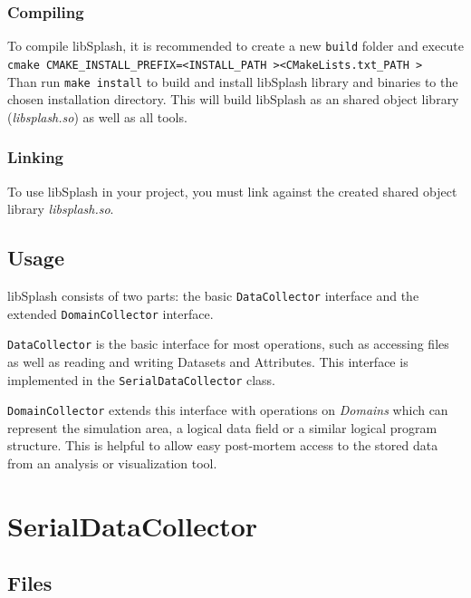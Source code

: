 \documentclass[a4paper,10pt,BCOR12mm]{report}
\newcommand{\command}[1]{\small \texttt{#1}}
\begin{document}
\subsection{Compiling}

To compile libSplash, it is recommended to create a new \command{build} folder
and execute \command{cmake CMAKE\_INSTALL\_PREFIX=\textless INSTALL\_PATH \textgreater \textless CMakeLists.txt\_PATH \textgreater}\\
Than run \command{make install} to build and install libSplash library and binaries to the chosen installation directory.
This will build libSplash as an shared object library (\emph{libsplash.so}) as well as all tools.

\subsection{Linking}

To use libSplash in your project, you must link against the created shared object library
\emph{libsplash.so}.


\section{Usage}

libSplash consists of two parts: the basic \texttt{DataCollector} interface and the extended \texttt{DomainCollector} interface.

\texttt{DataCollector} is the basic interface for most operations, such as accessing files as well as reading and writing Datasets and Attributes.
This interface is implemented in the \texttt{SerialDataCollector} class.

\texttt{DomainCollector} extends this interface with operations on \emph{Domains} which can represent the simulation area,
a logical data field or a similar logical program structure. This is helpful to allow easy post-mortem access to the stored data from
an analysis or visualization tool.


\chapter{SerialDataCollector}

\section{Files}
\end{document}
